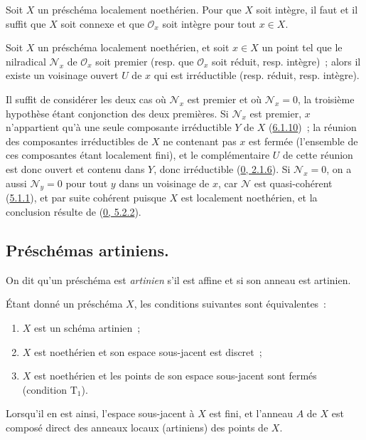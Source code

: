 \begin{corollary}[6.1.12]
\label{I.6.1.12-fr}
Soit $X$ un préschéma localement noethérien. Pour que $X$ soit intègre, il
faut et il suffit que $X$ soit connexe et que $\mathscr{O}_x$ soit intègre
pour tout $x\in X$.
\end{corollary}

\begin{proposition}[6.1.13]
\label{I.6.1.13-fr}
Soit $X$ un préschéma localement noethérien, et soit $x\in X$ un point tel que
le nilradical $\mathscr{N}_x$ de $\mathscr{O}_x$ soit premier (resp. que
$\mathscr{O}_x$ soit réduit, resp. intègre)~; alors il existe un voisinage
ouvert $U$ de $x$ qui est irréductible (resp. réduit, resp. intègre).
\end{proposition}

Il suffit de considérer les deux cas où $\mathscr{N}_x$ est premier et où
$\mathscr{N}_x=0$, la troisième hypothèse étant conjonction des deux
premières. Si $\mathscr{N}_x$ est premier, $x$ n'appartient qu'à une seule
composante irréductible $Y$ de $X$ (\hyperref[I.6.1.10-fr]{6.1.10})~; la
réunion des composantes irréductibles de $X$ ne contenant pas $x$ est fermée
(l'ensemble de ces composantes étant localement fini), et le complémentaire
$U$ de cette réunion est donc ouvert et contenu dans $Y$, donc irréductible
(\hyperref[0.2.1.6-fr]{0, 2.1.6}). Si $\mathscr{N}_x=0$, on a aussi
$\mathscr{N}_y=0$ pour tout $y$ dans un voisinage de $x$, car $\mathscr{N}$
est quasi-cohérent (\hyperref[I.5.1.1-fr]{5.1.1}), et par suite cohérent
puisque $X$ est localement noethérien, et la conclusion résulte de
(\hyperref[0.5.2.2-fr]{0, 5.2.2}).

\subsection{Préschémas artiniens.}
\label{subsection:I.6.2-fr}

\begin{definition}[6.2.1]
\label{I.6.2.1-fr}
On dit qu'un préschéma est \emph{artinien} s'il est affine et si son anneau
est artinien.
\end{definition}

\begin{proposition}[6.2.2]
\label{I.6.2.2-fr}
Étant donné un préschéma $X$, les conditions suivantes sont équivalentes~:
\begin{enumerate}
  \item[a)] $X$ est un schéma artinien~;
  \item[b)] $X$ est noethérien et son espace sous-jacent est discret~;
  \item[c)] $X$ est noethérien et les points de son espace sous-jacent sont
    fermés (condition $\mathrm{T}_1$).
\end{enumerate}

Lorsqu'il en est ainsi, l'espace sous-jacent à $X$ est fini, et l'anneau $A$
de $X$ est composé direct des anneaux locaux (artiniens) des points de $X$.
\end{proposition}

